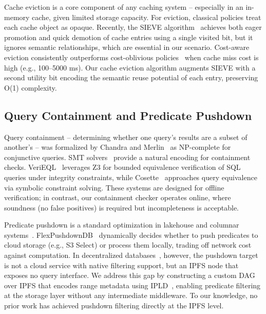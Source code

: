 Cache eviction is a core component of any caching system -- especially in an in-memory cache, given limited storage capacity. For eviction, classical policies \cite{megiddo2003arc, einziger2017tinylfu,jiang2002lirs,zhang2024sieve} treat each cache object as opaque. Recently, the SIEVE algorithm~\cite{zhang2024sieve} achieves both eager promotion and quick demotion of cache entries using a single visited bit, but it ignores semantic relationships, which are essential in our scenario. Cost-aware eviction consistently outperforms cost-oblivious policies~\cite{podlipnig2003survey} when cache miss cost is high (e.g., 100--5000 ms). Our cache eviction algorithm augments SIEVE with a second utility bit encoding the semantic reuse potential of each entry, preserving O(1) complexity.


\subsection{Query Containment and Predicate Pushdown}
\label{sec:containment}

Query containment -- determining whether one query's results are a subset of another's -- was formalized by Chandra and Merlin~\cite{chandra1977optimal} as NP-complete for conjunctive queries. SMT solvers~\cite{de2008z3} provide a natural encoding for containment checks. VeriEQL~\cite{he2024verieql} leverages Z3 for bounded equivalence verification of SQL queries under integrity constraints, while Cosette~\cite{chu2017cosette} approaches query equivalence via symbolic constraint solving. These systems are designed for offline verification; in contrast, our containment checker operates online, where soundness (no false positives) is required but incompleteness is acceptable.

Predicate pushdown is a standard optimization in lakehouse and columnar systems~\cite{armbrust2021lakehouse}. FlexPushdownDB~\cite{yang2021flexpushdowndb} dynamically decides whether to push predicates to cloud storage (e.g., S3 Select) or process them locally, trading off network cost against computation. In decentralized databases~\cite{hossain2025mtdb, mukherjee2025web3db}, however, the pushdown target is not a cloud service with native filtering support, but an IPFS node that exposes no query interface. We address this gap by constructing a custom DAG over IPFS that encodes range metadata using IPLD~\cite{ipld2023spec}, enabling predicate filtering at the storage layer without any intermediate middleware. To our knowledge, no prior work has achieved pushdown filtering directly at the IPFS level.


